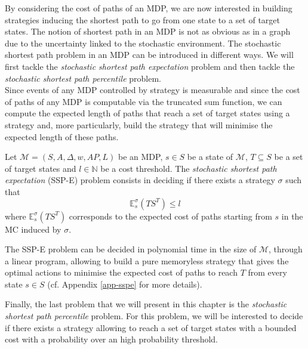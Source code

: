 By considering the cost of paths of an MDP, we are now interested in building
strategies inducing the shortest path to go from one state to a set of target
states. The notion of shortest path in an MDP is not as obvious as in a graph due to the uncertainty linked to the stochastic environment.
The stochastic shortest path problem in an MDP can be introduced in different
ways. We will first tackle the \textit{stochastic shortest path expectation} problem and
then tackle the \textit{stochastic shortest path percentile} problem. \\

Since events of any MDP controlled by strategy is measurable and
since the cost of paths of any MDP is computable via the truncated sum function, we can
compute the expected length of paths that reach a set of target states using a strategy and, more particularly, build the strategy that will minimise the expected length of these paths.

\begin{definition}
Let $\mathcal{M}=(S, A, \Delta, w, AP, L)$ be an MDP, $s \in S$ be a state of $\mathcal{M}$,
$T \subseteq S$ be a set of target states and $l \in \mathbb{N}$ be a cost threshold. The \textit{stochastic shortest path expectation} (SSP-E) problem
consists in deciding if there exists a strategy $\sigma$ such that
\[
  \mathbb{E}^\sigma_s(TS^T) \leq l
\]
where $\mathbb{E}_s^\sigma(TS^T)$ corresponds to the expected cost of paths starting from $s$ in the MC induced by $\sigma$.
\end{definition}

\begin{theorem}
  The SSP-E problem can be decided in polynomial time in the size of $\mathcal{M}$, through a linear program, allowing to build a pure memoryless strategy that gives the optimal actions to minimise the expected cost of paths to reach $T$ from every state $s \in S$ (cf. Appendix \ref{app-sspe} for more details).
\end{theorem}

Finally, the last problem that we will present in this chapter is the
\textit{stochastic shortest path percentile} problem. For this problem, we will
be interested to decide if there exists a strategy allowing to reach a set of target states with
a bounded cost with a probability over an high probability threshold.

